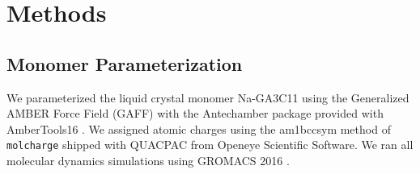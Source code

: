 \documentclass[journal=jpcbfk,manuscript=article]{achemso}
\begin{document}
% 
%
%
  

  \section{Methods}
 
  \subsection{Monomer Parameterization}

  We parameterized the liquid crystal monomer Na-GA3C11 using the Generalized AMBER
  Force Field (GAFF) \cite{wang_development_2004} with the Antechamber package
  \cite{wang_automatic_2006} provided with AmberTools16
  \cite{case_ambertools16_2016}. We assigned atomic charges using the am1bccsym
  method of \texttt{molcharge} shipped with QUACPAC from Openeye Scientific
  Software. We ran all molecular dynamics simulations using GROMACS 2016
  \cite{bekker_gromacs:_1993,berendsen_gromacs:_1995,van_der_spoel_gromacs:_2005,hess_gromacs_2008}.
\end{document}
